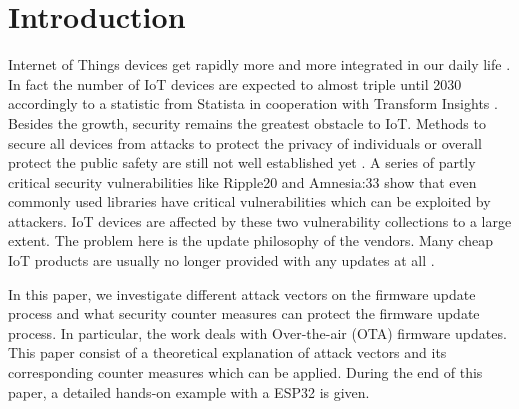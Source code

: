 \section{Introduction}
Internet of Things devices get rapidly more and more integrated in our daily life \cite{Yu2017}. In fact the number of IoT devices are expected to almost triple until 2030 accordingly to a statistic from Statista in cooperation with Transform Insights \cite{StatisticTransformaInsights} \cite{StatisticTransformaInsightsByUseCase}. Besides the growth, security remains the greatest obstacle to IoT. Methods to secure all devices from attacks to protect the privacy of individuals or overall protect the public safety are still not well established yet \cite{Bettayeb2019}. A series of partly critical security vulnerabilities like Ripple20 and Amnesia:33 show that even commonly used libraries have critical vulnerabilities which can be exploited by attackers. IoT devices are affected by these two vulnerability collections to a large extent. The problem here is the update philosophy of the vendors. Many cheap IoT products are usually no longer provided with any updates at all \cite{OliviavonWesternhagen} \cite{Schmidt}.

In this paper, we investigate different attack vectors on the firmware update process and what security counter measures can protect the firmware update process. In particular, the work deals with Over-the-air (OTA) firmware updates. This paper consist of a theoretical explanation of attack vectors and its corresponding counter measures which can be applied. During the end of this paper, a detailed hands-on example with a ESP32 is given.